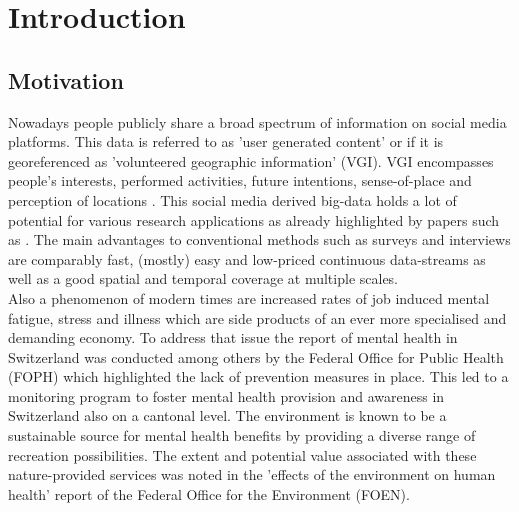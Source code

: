 \chapter{Introduction}
\section{Motivation}
Nowadays people publicly share a broad spectrum of information on social media platforms. This data is referred to as 'user generated content' or if it is georeferenced as 'volunteered geographic information' (VGI). VGI encompasses people's interests, performed activities, future intentions, sense-of-place and perception of locations \parencite{Goodchild2007}. This social media derived big-data holds a lot of potential for various research applications as already highlighted by papers such as \textcite{DiMinin2015, DiMinin2017, Meentemeyer2016}. The main advantages to conventional methods such as surveys and interviews are comparably fast, (mostly) easy and low-priced continuous data-streams as well as a good spatial and temporal coverage at multiple scales.\\
Also a phenomenon of modern times are increased rates of job induced mental fatigue, stress and illness which are side products of an ever more specialised and demanding economy. To address that issue the report of mental health in Switzerland \parencite{Ruesch2003} was conducted among others by the Federal Office for Public Health (FOPH) which highlighted the lack of prevention measures in place. This led to a monitoring program to foster mental health provision and awareness in Switzerland \parencite{Schuler2012} also on a cantonal level. The environment is known to be a sustainable source for mental health benefits by providing a diverse range of recreation possibilities. The extent and potential value associated with these nature-provided services was noted in the 'effects of the environment on human health' report \parencite{Ragettli2017} of the Federal Office for the Environment (FOEN).\\

